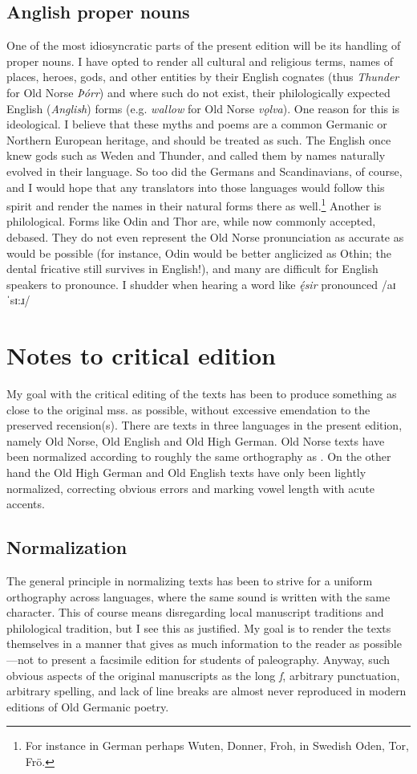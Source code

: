   \subsection{Anglish proper nouns}
    One of the most idiosyncratic parts of the present edition will be its handling of proper nouns. I have opted to render all cultural and religious terms, names of places, heroes, gods, and other entities by their English cognates (thus \emph{Thunder} for Old Norse \emph{Þórr}) and where such do not exist, their philologically expected English (\emph{Anglish}) forms (e.g. \emph{wallow} for Old Norse \emph{vǫlva}).
    One reason for this is ideological. I believe that these myths and poems are a common Germanic or Northern European heritage, and should be treated as such. The English once knew gods such as Weden and Thunder, and called them by names naturally evolved in their language. So too did the Germans and Scandinavians, of course, and I would hope that any translators into those languages would follow this spirit and render the names in their natural forms there as well.\footnote{For instance in German perhaps Wuten, Donner, Froh, in Swedish Oden, Tor, Frö.}
    Another is philological. Forms like Odin and Thor are, while now commonly accepted, debased. They do not even represent the Old Norse pronunciation as accurate as would be possible (for instance, Odin would be better anglicized as Othin; the dental fricative still survives in English!), and many are difficult for English speakers to pronounce. I shudder when hearing a word like \emph{ę́sir} pronounced /aɪˈsɪ:ɹ/

\section{Notes to critical edition}
  My goal with the critical editing of the texts has been to produce something as close to the original mss. as possible, without excessive emendation to the preserved recension(s). There are texts in three languages in the present edition, namely Old Norse, Old English and Old High German. Old Norse texts have been normalized according to roughly the same orthography as \textcite{FinnurEdda}. On the other hand the Old High German and Old English texts have only been lightly normalized, correcting obvious errors and marking vowel length with acute accents.

  \subsection{Normalization}
    The general principle in normalizing texts has been to strive for a uniform orthography across languages, where the same sound is written with the same character. This of course means disregarding local manuscript traditions and philological tradition, but I see this as justified. My goal is to render the texts themselves in a manner that gives as much information to the reader as possible—not to present a facsimile edition for students of paleography. Anyway, such obvious aspects of the original manuscripts as the long \emph{ſ}, arbitrary punctuation, arbitrary spelling, and lack of line breaks are almost never reproduced in modern editions of Old Germanic poetry.

